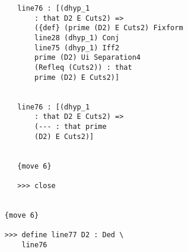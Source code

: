 \documentclass[12pt]{article}
\begin{document}
\begin{verbatim}
                     line76 : [(dhyp_1 
                         : that D2 E Cuts2) => 
                         ({def} (prime (D2) E Cuts2) Fixform 
                         line28 (dhyp_1) Conj 
                         line75 (dhyp_1) Iff2 
                         prime (D2) Ui Separation4 
                         (Refleq (Cuts2)) : that 
                         prime (D2) E Cuts2)]


                     line76 : [(dhyp_1 
                         : that D2 E Cuts2) => 
                         (--- : that prime 
                         (D2) E Cuts2)]


                     {move 6}

                     >>> close


                  {move 6}

                  >>> define line77 D2 : Ded \
                      line76



\end{verbatim}
\end{document}
